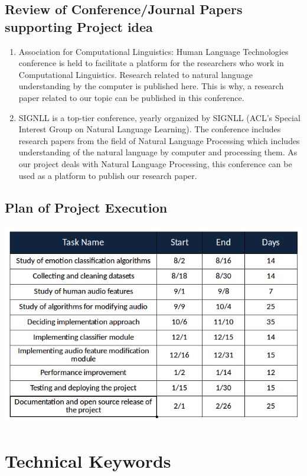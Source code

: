 \documentclass[oneside,a4paper,12pt]{book}
\begin{document}
\section{Review of Conference/Journal Papers supporting Project idea}
\label{sec:survey}
\begin{enumerate}
\item Association for Computational Linguistics: Human Language Technologies conference is held to facilitate a platform for the researchers who work in Computational Linguistics. Research related to natural language understanding by the computer is published here. This is why, a research paper related to our topic can be published in this conference.
\item SIGNLL is a top-tier conference, yearly organized by SIGNLL (ACL's Special Interest Group on Natural Language Learning). The conference includes research papers from the field of Natural Language Processing which includes understanding of the natural language by computer and processing them. As our project deals with Natural Language Processing, this conference can be used as a platform to publish our research paper.
\end{enumerate}

\section{Plan of Project Execution}
\includegraphics[width=470pt]{project_plan.png} \\



\chapter{Technical Keywords}
\end{document}
